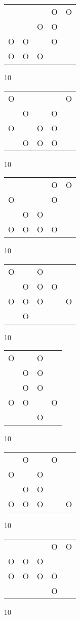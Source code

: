 \begin{tabular}{|m{0.2cm}m{0.2cm}m{0.2cm}m{0.2cm}m{0.2cm}|}\hline
 & & &O&O\\
 & &O&O& \\
O&O& &O& \\
O&O&O& & \\
\hline\end{tabular}10
\begin{tabular}{|m{0.2cm}m{0.2cm}m{0.2cm}m{0.2cm}m{0.2cm}|}\hline
O& & & &O\\
 &O& &O& \\
O& &O&O& \\
 &O&O&O& \\
\hline\end{tabular}10
\begin{tabular}{|m{0.2cm}m{0.2cm}m{0.2cm}m{0.2cm}m{0.2cm}|}\hline
 & & &O&O\\
O& & &O& \\
 &O&O& & \\
O&O&O&O& \\
\hline\end{tabular}10
\begin{tabular}{|m{0.2cm}m{0.2cm}m{0.2cm}m{0.2cm}m{0.2cm}|}\hline
O& &O& & \\
 &O&O&O& \\
O&O&O& &O\\
 &O& & & \\
\hline\end{tabular}10
\begin{tabular}{|m{0.2cm}m{0.2cm}m{0.2cm}m{0.2cm}|}\hline
O& &O& \\
 &O&O& \\
 &O&O& \\
O&O& &O\\
 & &O& \\
\hline\end{tabular}10
\begin{tabular}{|m{0.2cm}m{0.2cm}m{0.2cm}m{0.2cm}m{0.2cm}|}\hline
 &O& &O& \\
O& &O& & \\
 &O&O& & \\
O&O&O& &O\\
\hline\end{tabular}10
\begin{tabular}{|m{0.2cm}m{0.2cm}m{0.2cm}m{0.2cm}m{0.2cm}|}\hline
 & & &O&O\\
O&O&O& & \\
O&O&O&O& \\
 & & &O& \\
\hline\end{tabular}10
